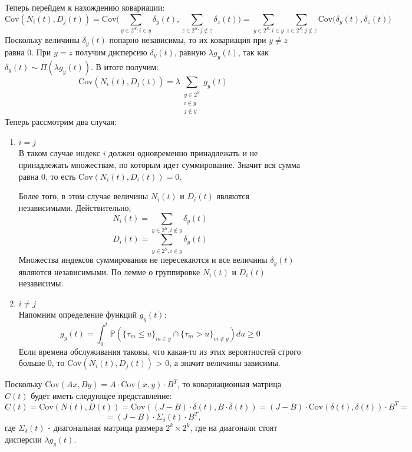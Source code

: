 \documentclass[12pt]{article}
\theoremstyle{plain}
\theoremstyle{definition}
\theoremstyle{remark}
\begin{document}
Теперь перейдем к нахождению ковариации:
\[
    \mathrm{Cov}(N_i(t), D_j(t)) = \mathrm{Cov}\bigg(\sum_{y \in 2^S: i \in y}\delta_y(t), \sum_{z \in 2^S : j \not \in z}\delta_z(t)\bigg) = \sum_{y \in 2^S: i \in y}\sum_{z \in 2^S : j \not \in z}\mathrm{Cov}\bigg(\delta_y(t), \delta_z(t)\bigg)
\]
Поскольку величины $\delta_y(t)$ попарно независимы, то их ковариация при $y \not = z$ равна 0. При $y = z$ получим дисперсию $\delta_y(t)$, равную $\lambda g_y(t)$, так как $\delta_y(t) \sim \Pi(\lambda g_y(t))$. В итоге получим:
\begin{equation}
    \mathrm{Cov}(N_i(t), D_j(t)) = \lambda \sum_{\substack{y \in 2^S \\ i \in y \\ j \not \in y}}g_y(t) \label{eq:cov}
\end{equation}
Теперь рассмотрим два случая:
\begin{enumerate}
    \item $i = j$ \\
    В таком случае индекс $i$ должен одновременно принадлежать и не принадлежать множествам, по которым идет суммирование. Значит вся сумма равна 0, то есть $\mathrm{Cov}(N_i(t), D_i(t)) = 0$.

    Более того, в этом случае величины $N_i(t)$ и $D_i(t)$ являются независимыми. Действительно, 
    \[
        N_i(t) = \sum_{y \in 2^S, i \not \in y} \delta_y(t)
    \]
    \[
        D_i(t) = \sum_{y \in 2^S, i \in y} \delta_y(t)
    \]
    Множества индексов суммирования не пересекаются и все величины $\delta_y(t)$ являются независимыми. По лемме о группировке $N_i(t)$ и $D_i(t)$ независимы.
    \item $i \not = j$ \\
    Напомним определение функций $g_y(t)$:
    \[
        g_y(t) = \int_0^t \mathbb{P}(\{\tau_m \le u\}_{m \in y} \cap \{\tau_m > u\}_{m \not \in y})du \ge 0
    \]
    Если времена обслуживания таковы, что какая-то из этих вероятностей строго больше $0$, то $\mathrm{Cov}(N_i(t), D_j(t))$ > 0, а значит величины зависимы.
\end{enumerate}

Поскольку $\mathrm{Cov}(Ax, By) = A \cdot\mathrm{Cov}(x, y) \cdot B^T$, то ковариационная матрица $C(t)$ будет иметь следующее представление:
\[
    C(t) = \mathrm{Cov}(N(t), D(t)) = \mathrm{Cov}((J - B)\cdot\delta(t), B\cdot \delta(t)) = (J - B) \cdot \mathrm{Cov}(\delta(t), \delta(t)) \cdot B^T = 
\]
\[
    = (J - B) \cdot \Sigma_\delta(t) \cdot B^T,
\]
где $\Sigma_\delta(t)$ - диагональная матрица размера $2^k \times 2^k$, где на диагонали стоят дисперсии $\lambda g_y(t)$.
\end{document}
